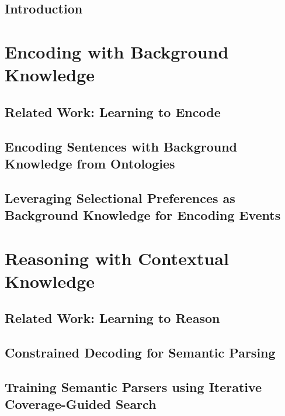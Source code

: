 \documentclass[hidelinks,12pt]{cmuthesis}
\begin{document}
\chapter{Introduction}
\label{chapter:introduction}

%
\part{Encoding with Background Knowledge}
\chapter{Related Work: Learning to Encode}
\label{chapter:encoding_related_work}

\chapter{Encoding Sentences with Background Knowledge from Ontologies}
\label{chapter:ontolstm}

\chapter{Leveraging Selectional Preferences as Background Knowledge for Encoding Events}
\label{chapter:nem}

\part{Reasoning with Contextual Knowledge}
\chapter{Related Work: Learning to Reason}
\label{chapter:reasoning_related_work}

\chapter{Constrained Decoding for Semantic Parsing}
\label{chapter:wikitables}

\chapter{Training Semantic Parsers using Iterative Coverage-Guided Search}
\label{chapter:nlvr}

\end{document}
